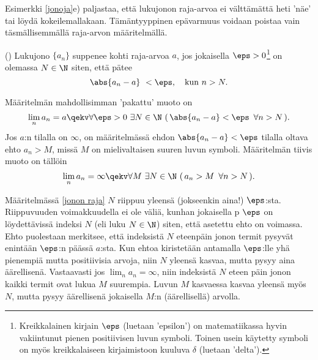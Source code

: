 Esimerkki \ref{jonoja}e) paljastaa, että lukujonon raja-arvoa ei välttämättä heti 'näe' tai 
löydä kokeilemallakaan. Tämäntyyppinen epävarmuus voidaan poistaa vain täsmällisemmällä 
raja-arvon määritelmällä.

\begin{Def} \label{jonon raja} ()
 
  Lukujono $\{a_n\}$
suppenee kohti raja-arvoa $a$, jos jokaisella $\eps > 0$\footnote[2]{Kreikkalainen kirjain
$\eps$ (luetaan  'epsilon') on matematiikassa hyvin vakiintunut pienen positiivisen luvun
symboli. Toinen usein käytetty symboli on myös kreikkalaiseen kirjaimistoon kuuluva $\delta$
(luetaan 'delta').} on olemassa $N\in\N$ siten, että pätee
\[
\abs{a_n - a}\ < \eps, \quad \text{kun}\ n > N.
\]
\end{Def}
Määritelmän mahdollisimman 'pakattu' muoto on 
\[
\lim_n a_n = a 
    \qekv \forall \eps > 0\ \exists N \in \N\ (\,\abs{a_n-a} < \eps\ \,\forall n > N\,).
\]
Jos $a$:n tilalla on $\infty$, on määritelmässä ehdon $\abs{a_n - a} < \eps$ tilalla oltava ehto
$a_n > M$, missä $M$ on mielivaltaisen suuren luvun symboli. Määritelmän tiivis muoto on tällöin
\[
\lim_n a_n = \infty \qekv \forall M\ \exists N \in \N\ (\,a_n > M\ \,\forall n > N\,).
\]

Määritelmässä \ref{jonon raja} $N$ riippuu yleensä (jokseenkin aina!) $\eps$:sta. Riippuvuuden
voimakkuudella ei ole väliä, kunhan jokaisella p $\eps$ on löydettävissä
 indeksi $N$ (eli luku $N\in\N$) siten, että asetettu ehto on voimassa. Ehto
puolestaan merkitsee, että indeksistä $N$ eteenpäin jonon  termit pysyvät enintään
$\eps$:n päässä $a$:sta. Kun ehtoa kiristetään antamalla $\eps$:lle yhä pienempiä mutta 
positiivisia arvoja, niin $N$ yleensä kasvaa, mutta pysyy aina äärellisenä. Vastaavasti jos
$\lim_n a_n = \infty$, niin indeksistä $N$ eteen päin jonon kaikki termit ovat lukua $M$
suurempia. Luvun $M$ kasvaessa kasvaa yleensä myös $N$, mutta pysyy äärellisenä jokaisella
$M$:n (äärellisellä) arvolla.

